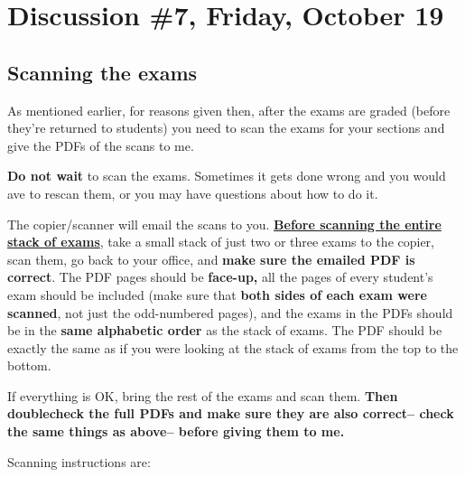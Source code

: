 \documentclass[12pt]{article}
\begin{document}

  \section{Discussion \#7, Friday, October 19}

    \subsection{Scanning the exams}

      As mentioned earlier, for reasons given then, after the exams are graded
    (before they're returned to students) you need to scan the exams for your
    sections and give the PDFs of the scans to me.

      \textbf{Do not wait} to scan the exams.  Sometimes it gets done wrong and
    you would ave to rescan them, or you may have questions about how to do
    it.

      The copier/scanner will email the scans to you.  \textbf{\underline{Before
    scanning the entire stack of exams}}, take a small stack of just two
    or three exams to the copier, scan them, go back to your office, and
    \textbf{make sure the emailed PDF is correct}.  The PDF pages should be
    \textbf{face-up,} all the pages of every student's exam should be included
    (make sure that \textbf{both sides of each exam were scanned}, not just
    the odd-numbered pages), and the exams in the PDFs should be in the
    \textbf{same alphabetic order} as the stack of exams.  The PDF should be
    exactly the same as if you were looking at the stack of exams from the top
    to the bottom.

      If everything is OK, bring the rest of the exams and scan them.
    \textbf{Then doublecheck the full PDFs and make sure they are also
    correct-- check the same things as above-- before giving them to me.}

      Scanning instructions are:

      \vspace{-2.5mm}
\end{document}
